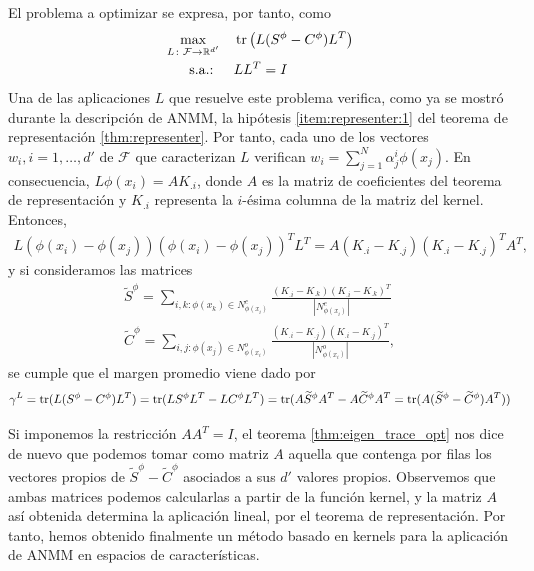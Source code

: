 El problema a optimizar se expresa, por tanto, como
\begin{align}
    \max_{L \colon \mathcal{F} \to \mathbb{R}^{d'}} &\quad \operatorname{tr}\left(L(S^{\phi}-C^{\phi})L^T\right)  \\
    \text{s.a.: } &\quad LL^T = I
\end{align}
Una de las aplicaciones $L$ que resuelve este problema verifica, como ya se mostró durante la descripción de ANMM, la hipótesis \ref{item:representer:1} del teorema de representación \ref{thm:representer}. Por tanto, cada uno de los vectores $w_i, i = 1,\dots,d'$ de $\mathcal{F}$ que caracterizan $L$ verifican $w_i = \sum_{j=1}^N \alpha_j^i \phi(x_j)$. En consecuencia, $L\phi(x_i) = AK_{.i}$, donde $A$ es la matriz de coeficientes del teorema de representación y $K_{.i}$ representa la $i$-ésima columna de la matriz del kernel. Entonces,
\begin{equation*}
    \begin{split}
        L(\phi(x_i)-\phi(x_j))(\phi(x_i)-\phi(x_j))^TL^T = A(K_{.i}-K_{.j})(K_{.i}-K_{.j})^TA^T,
    \end{split}
\end{equation*}
y si consideramos las matrices
\begin{align*}
    \widetilde{S}^{\phi} = \sum\limits_{i,k \colon \phi(x_k) \in N_{\phi(x_i)}^e} \frac{(K_{.i}-K_{.k})(K_{.i}-K_{.k})^T}{|N_{\phi(x_i)}^e|} \\
    \widetilde{C}^{\phi} = \sum\limits_{i,j \colon \phi(x_j) \in N_{\phi(x_i)}^o} \frac{(K_{.i}-K_{.j})(K_{.i}-K_{.j})^T}{|N_{\phi(x_i)}^o|},
\end{align*}
se cumple que el margen promedio viene dado por
\begin{equation*}
    \gamma^L = \operatorname{tr}(L(S^{\phi}-C^{\phi})L^T) = \operatorname{tr}(LS^{\phi}L^T-LC^{\phi}L^T) = \operatorname{tr}(A \widetilde{S}^{\phi} A^T - A\widetilde{C}^{\phi}A^T = \operatorname{tr}(A(\widetilde{S}^{\phi}-\widetilde{C}^{\phi})A^T))
\end{equation*} 

Si imponemos la restricción $AA^T = I$, el teorema \ref{thm:eigen_trace_opt} nos dice de nuevo que podemos tomar como matriz $A$ aquella que contenga por filas los vectores propios de $\widetilde{S}^{\phi}-\widetilde{C}^{\phi}$ asociados a sus $d'$ valores propios. Observemos que ambas matrices podemos calcularlas a partir de la función kernel, y la matriz $A$ así obtenida determina la aplicación lineal, por el teorema de representación. Por tanto, hemos obtenido finalmente un método basado en kernels para la aplicación de ANMM en espacios de características.


